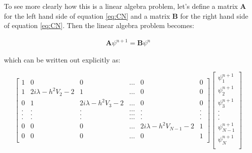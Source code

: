 
To see more clearly how this is a linear algebra problem, let's define
a matrix $\boldsymbol{A}$ for the left hand side of equation
\eqref{eq:CN} and a matrix $\boldsymbol{B}$ for the right hand side of
equation \eqref{eq:CN}.  Then the linear algebra problem becomes:

\begin{align}
\boldsymbol{A} \psi^{n+1} = \boldsymbol{B} \psi^n \label{eq:matrices}
\end{align} 

which can be written out explicitly as:

\[
\begin{bmatrix}
    1       & 0 & 0 & \dots & 0 & 0 \\
    1       & 2 i \lambda - h^2V_2 - 2 & 1 & \dots & 0 & 0 \\
    0 & 1       & 2 i \lambda - h^2V_3 - 2 & \dots & 0 & 0\\
    . & . & . & \dots & . & .\\
    . & . & . & \dots & . & .\\
    . & . & . & \dots & . & .\\
    0 & 0 & 0& \dots& 2 i \lambda - h^2V_{N-1} - 2 & 1 \\
    0       & 0 & 0 & \dots & 0 & 1 \\
\end{bmatrix}
\begin{bmatrix}
    \psi_1^{n+1} \\ 
    \psi_2^{n+1} \\ 
    \psi_3^{n+1} \\ 
      .\\
      .\\
      .\\
      \psi_{N-1}^{n+1}\\
      \psi_{N}^{n+1}\\
\end{bmatrix}\]

